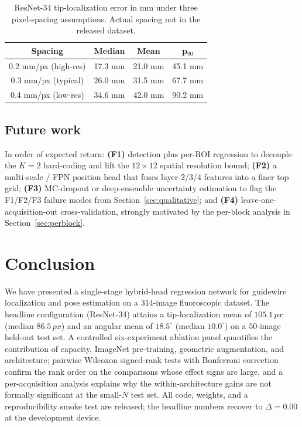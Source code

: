 \documentclass[conference,10pt,letterpaper]{IEEEtran}
\newcommand{\rnt}{ResNet-34}
\newcommand{\px}{\,px}
\begin{document}
\begin{table}[t]
\caption{\protect\rnt{} tip-localization error in mm under three
pixel-spacing assumptions. Actual spacing not in the released dataset.}
\label{tab:mm}
\centering
\renewcommand{\arraystretch}{1.15}
\small
\begin{tabular}{c c c c}
\toprule
\textbf{Spacing} & \textbf{Median} & \textbf{Mean} & \textbf{p$_{90}$}\\
\midrule
0.2 mm/px (high-res) & 17.3 mm & 21.0 mm & 45.1 mm\\
0.3 mm/px (typical)  & 26.0 mm & 31.5 mm & 67.7 mm\\
0.4 mm/px (low-res)  & 34.6 mm & 42.0 mm & 90.2 mm\\
\bottomrule
\end{tabular}
\end{table}

\subsection{Future work}
In order of expected return: \textbf{(F1)} detection plus per-ROI
regression to decouple the $K{=}2$ hard-coding and lift the
$12{\times}12$ spatial resolution bound; \textbf{(F2)} a multi-scale /
FPN position head that fuses layer-2/3/4 features into a finer top
grid; \textbf{(F3)} MC-dropout or deep-ensemble uncertainty estimation
to flag the F1/F2/F3 failure modes from Section~\ref{sec:qualitative};
and \textbf{(F4)} leave-one-acquisition-out cross-validation, strongly
motivated by the per-block analysis in Section~\ref{sec:perblock}.

\section{Conclusion}
\label{sec:conclusion}
We have presented a single-stage hybrid-head regression network for
guidewire localization and pose estimation on a 314-image fluoroscopic
dataset. The headline configuration (\rnt{}) attains a tip-localization
mean of $105.1\px$ (median $86.5\px$) and an angular mean of
$18.5^\circ$ (median $10.0^\circ$) on a $50$-image held-out test set.
A controlled six-experiment ablation panel quantifies the contribution
of capacity, ImageNet pre-training, geometric augmentation, and
architecture; pairwise Wilcoxon signed-rank tests with Bonferroni
correction confirm the rank order on the comparisons whose effect
signs are large, and a per-acquisition analysis explains why the
within-architecture gains are not formally significant at the small-$N$
test set. All code, weights, and a reproducibility smoke test are
released; the headline numbers recover to $\Delta{=}0.00$ at the
development device.
\end{document}
